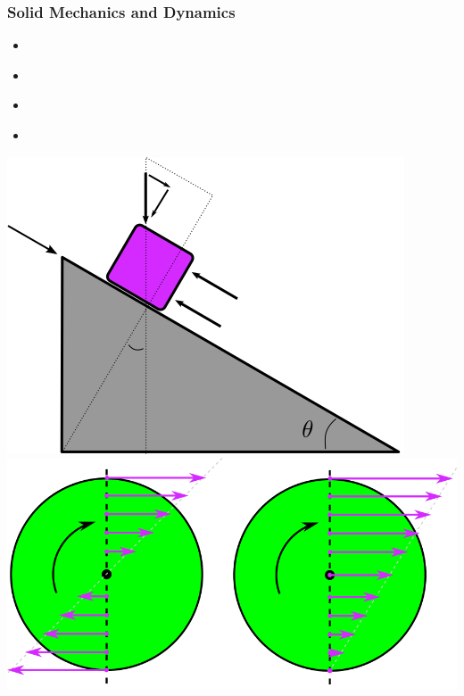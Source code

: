 \documentclass[fleqn]{beamer} %
\newcommand{\sectionIIIsubsectionIItitle}{Solid Mechanics and Dynamics}
\begin{document}
			\begin{frame}
				\frametitle{\sectionIIIsubsectionIItitle}
				\bigskip
				
				\begin{multicols}{2}
				\begin{itemize}
					\item \item \underline{\hspace{50mm}}\hspc \vspcc
					\item \underline{\hspace{50mm}} \hspc \vspcc
					\item \underline{\hspace{50mm}} \hspc \vspcc
				\end{itemize}

				\includegraphics[scale=0.209]{images/sliding_block.png}
				 \includegraphics[scale=0.125]{images/pure_roll_no_slip.png} 

\end{multicols}
\end{frame}
\end{document}
